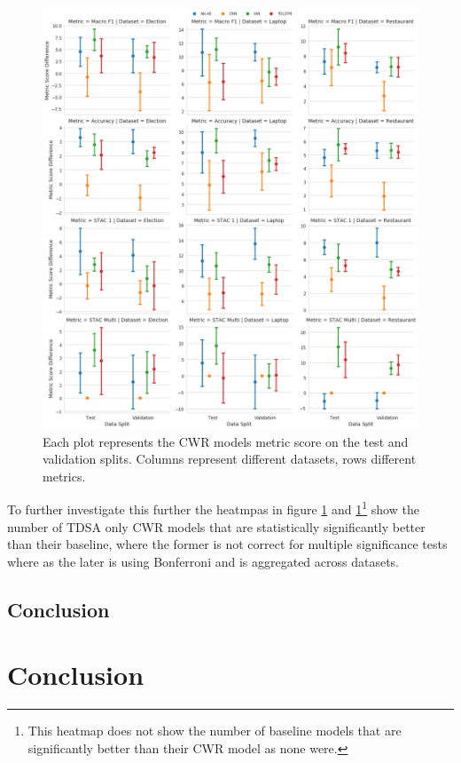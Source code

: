 \begin{figure}[!h]
    \centering
    \includegraphics[scale=0.3]{images/augmentation/methods_performance/CWR/overall_diff_cwr.png}
    \caption{Each plot represents the CWR models metric score on the test and validation splits. Columns represent different datasets, rows different metrics.}
    \label{fig:aug_overall_diff_cwr}
\end{figure}

To further investigate this further the heatmpas in figure \ref{} and \ref{}\footnote{This heatmap does not show the number of baseline models that are significantly better than their CWR model as none were.} show the number of TDSA only CWR models that are statistically significantly better than their baseline, where the former is not correct for multiple significance tests where as the later is using Bonferroni and is aggregated across datasets. 
\subsection{Conclusion}

\section{Conclusion}

